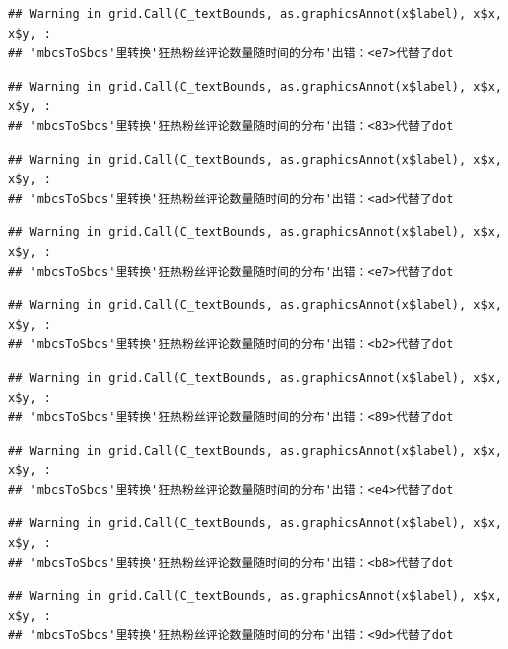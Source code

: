 \documentclass[
]{article}
\begin{document}
\begin{verbatim}
## Warning in grid.Call(C_textBounds, as.graphicsAnnot(x$label), x$x, x$y, :
## 'mbcsToSbcs'里转换'狂热粉丝评论数量随时间的分布'出错：<e7>代替了dot
\end{verbatim}

\begin{verbatim}
## Warning in grid.Call(C_textBounds, as.graphicsAnnot(x$label), x$x, x$y, :
## 'mbcsToSbcs'里转换'狂热粉丝评论数量随时间的分布'出错：<83>代替了dot
\end{verbatim}

\begin{verbatim}
## Warning in grid.Call(C_textBounds, as.graphicsAnnot(x$label), x$x, x$y, :
## 'mbcsToSbcs'里转换'狂热粉丝评论数量随时间的分布'出错：<ad>代替了dot
\end{verbatim}

\begin{verbatim}
## Warning in grid.Call(C_textBounds, as.graphicsAnnot(x$label), x$x, x$y, :
## 'mbcsToSbcs'里转换'狂热粉丝评论数量随时间的分布'出错：<e7>代替了dot
\end{verbatim}

\begin{verbatim}
## Warning in grid.Call(C_textBounds, as.graphicsAnnot(x$label), x$x, x$y, :
## 'mbcsToSbcs'里转换'狂热粉丝评论数量随时间的分布'出错：<b2>代替了dot
\end{verbatim}

\begin{verbatim}
## Warning in grid.Call(C_textBounds, as.graphicsAnnot(x$label), x$x, x$y, :
## 'mbcsToSbcs'里转换'狂热粉丝评论数量随时间的分布'出错：<89>代替了dot
\end{verbatim}

\begin{verbatim}
## Warning in grid.Call(C_textBounds, as.graphicsAnnot(x$label), x$x, x$y, :
## 'mbcsToSbcs'里转换'狂热粉丝评论数量随时间的分布'出错：<e4>代替了dot
\end{verbatim}

\begin{verbatim}
## Warning in grid.Call(C_textBounds, as.graphicsAnnot(x$label), x$x, x$y, :
## 'mbcsToSbcs'里转换'狂热粉丝评论数量随时间的分布'出错：<b8>代替了dot
\end{verbatim}

\begin{verbatim}
## Warning in grid.Call(C_textBounds, as.graphicsAnnot(x$label), x$x, x$y, :
## 'mbcsToSbcs'里转换'狂热粉丝评论数量随时间的分布'出错：<9d>代替了dot
\end{verbatim}
\end{document}
